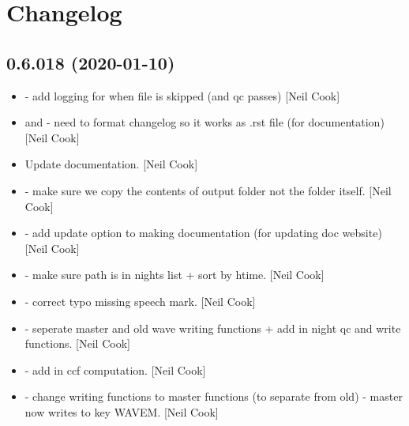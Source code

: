 \documentclass[a4paper,10pt,english]{report}
\begin{document}
\section{Changelog}
\label{\detokenize{misc/changelog:changelog}}\label{\detokenize{misc/changelog::doc}}

\subsection{0.6.018 (2020-01-10)}
\label{\detokenize{misc/changelog:id1}}\begin{itemize}
\item {} 
 - add logging for when file
is skipped (and qc passes) {[}Neil Cook{]}

\item {} 
 and
 - need to format changelog so it
works as .rst file (for documentation) {[}Neil Cook{]}

\item {} 
Update documentation. {[}Neil Cook{]}

\item {} 
 - make sure we copy
the contents of output folder not the folder itself. {[}Neil Cook{]}

\item {} 
 - add update option to making
documentation (for updating doc website) {[}Neil Cook{]}

\item {} 
 - make sure path is in nights
list + sort by htime. {[}Neil Cook{]}

\item {} 
 - correct typo \textendash{} missing
speech mark. {[}Neil Cook{]}

\item {} 
 - seperate master and old wave writing functions
+ add in night qc and write functions. {[}Neil Cook{]}

\item {} 
 - add in ccf computation. {[}Neil Cook{]}

\item {} 
 - change writing functions to master
functions (to separate from  \textendash{} old) - master now writes to
key WAVEM. {[}Neil Cook{]}


\end{itemize}
\end{document}
